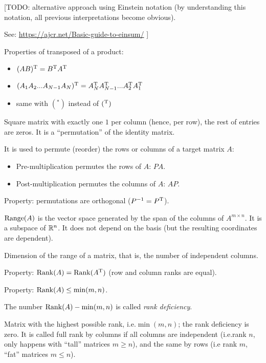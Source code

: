 \documentclass[
  12pt,
  paper=a4,
]{scrartcl} %
\begin{document}
\begin{description}

[TODO: alternative approach using Einstein notation (by understanding this notation, all previous interpretations become obvious).

See: \url{https://ajcr.net/Basic-guide-to-einsum/}
]

Properties of transposed of a product:
\begin{itemize}
    \item $(AB)^{\mathrm{T}}= B^{\mathrm{T}} A^{\mathrm{T}}$
    \item $(A_1A_2...A_{N-1}A_N)^{\mathrm{T}} =
            A_N^{\mathrm{T}} A_{N-1}^{\mathrm{T}}...A_2 ^{\mathrm{T}} A_1 ^{\mathrm{T}}$
    \item same with $(^*)$ instead of $(^{\mathrm{T}})$
\end{itemize}

\item[Permutation matrix:] Square matrix with exactly one $1$ per column (hence, per row), the rest of entries are zeros. It is a ``permutation'' of the identity matrix.

It is used to permute (reorder) the rows or columns of a target matrix $A$:
\begin{itemize}
    \item Pre-multiplication permutes the rows of $A$: $PA$.
    \item Post-multiplication permutes the columns of $A$: $AP$.
\end{itemize}

Property: permutations are orthogonal ($P^{-1}=P^{\mathrm{T}}$).


\item[Range of a matrix:] $\operatorname{Range}(A)$ is the vector space generated by the span of the columns of $A^{m\times n}$. It is a subspace of $\mathbb R^n$. It does not depend on the basis (but the resulting coordinates are dependent).

\item[Rank of a matrix:] Dimension of the range of a matrix, that is, the number of independent columns.

Property: $\operatorname{Rank}(A)=\operatorname{Rank}(A^{\mathrm{T}})$ (row and column ranks are equal).

Property: $\operatorname{Rank}(A) \le \min(m, n)$.

The number $\operatorname{Rank}(A) - \min(m, n)$ is called \emph{rank deficiency}.

\item[Full rank matrix:] Matrix with the highest possible rank, i.e.\@ $\min(m,n)$; the rank deficiency is zero. It is called full rank by columns if all columns are independent (i.e.\@ rank $n$, only happens with ``tall'' matrices $m\ge n$), and the same by rows (i.e rank $m$, ``fat'' matrices $m\le n$).


\end{description}
\end{document}
